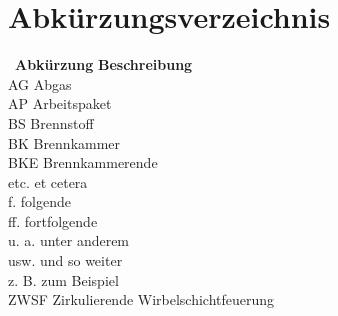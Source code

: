 
\chapter*{Abkürzungsverzeichnis}\thispagestyle{fancy}

\begin{tabbing}
\ \= \textbf{Abkürzung} \hspace{0.5cm} \= \textbf{Beschreibung} \kill
\\
\> AG \>  Abgas \\
\> AP \>  Arbeitspaket \\
\> BS \>  Brennstoff \\
\> BK \>  Brennkammer \\
\> BKE \>  Brennkammerende \\
\> etc. \>  et cetera \\
\> f. \>  folgende \\
\> ff. \>  fortfolgende \\
\> u. a. \>  unter anderem \\
\> usw. \>  und so weiter \\
\> z. B. \>  zum Beispiel \\
\> ZWSF \>  Zirkulierende Wirbelschichtfeuerung \\
\end{tabbing}
